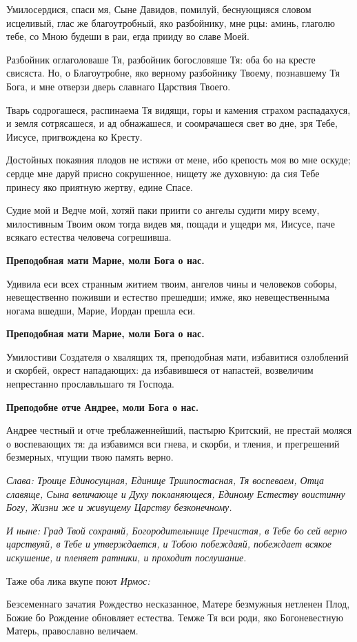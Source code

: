 Умилосердися, спаси мя, Сыне Давидов, помилуй, беснующияся словом исцеливый, глас же благоутробный, яко разбойнику, мне рцы: аминь, глаголю тебе, со Мною будеши в раи, егда прииду во славе Моей.


Разбойник оглаголоваше Тя, разбойник богословяше Тя: оба бо на кресте свисяста. Но, о Благоутробне, яко верному разбойнику Твоему, познавшему Тя Бога, и мне отверзи дверь славнаго Царствия Твоего.


Тварь содрогашеся, распинаема Тя видящи, горы и камения страхом распадахуся, и земля сотрясашеся, и ад обнажашеся, и соомрачашеся свет во дне, зря Тебе, Иисусе, пригвождена ко Кресту.


Достойных покаяния плодов не истяжи от мене, ибо крепость моя во мне оскуде; сердце мне даруй присно сокрушенное, нищету же духовную: да сия Тебе принесу яко приятную жертву, едине Спасе.


Судие мой и Ведче мой, хотяй паки приити со ангелы судити миру всему, милостивным Твоим оком тогда видев мя, пощади и ущедри мя, Иисусе, паче всякаго естества человеча согрешивша.


\bfseries Преподобная мати Марие, моли Бога о нас.\normalfont{}


Удивила еси всех странным житием твоим, ангелов чины и человеков соборы, невещественно поживши и естество прешедши; имже, яко невещественныма ногама вшедши, Марие, Иордан прешла еси.


\bfseries Преподобная мати Марие, моли Бога о нас.\normalfont{}


Умилостиви Создателя о хвалящих тя, преподобная мати, избавитися озлоблений и скорбей, окрест нападающих: да избавившеся от напастей, возвеличим непрестанно прославльшаго тя Господа.


\bfseries Преподобне отче Андрее, моли Бога о нас.\normalfont{}


Андрее честный и отче треблаженнейший, пастырю Критский, не престай моляся о воспевающих тя: да избавимся вси гнева, и скорби, и тления, и прегрешений безмерных, чтущии твою память верно.


\itshape Слава\normalfont{}: Троице Единосущная, Единице Триипостасная, Тя воспеваем, Отца славяще, Сына величающе и Духу покланяющеся, Единому Естеству воистинну Богу, Жизни же и живущему Царству безконечному.


\itshape И ныне\normalfont{}: Град Твой сохраняй, Богородительнице Пречистая, в Тебе бо сей верно царствуяй, в Тебе и утверждается, и Тобою побеждаяй, побеждает всякое искушение, и пленяет ратники, и проходит послушание.


Таже оба лика вкупе поют \itshape Ирмос\normalfont{}:


Безсеменнаго зачатия Рождество несказанное, Матере безмужныя нетленен Плод, Божие бо Рождение обновляет естества. Темже Тя вси роди, яко Богоневестную Матерь, православно величаем.

\mychapterending